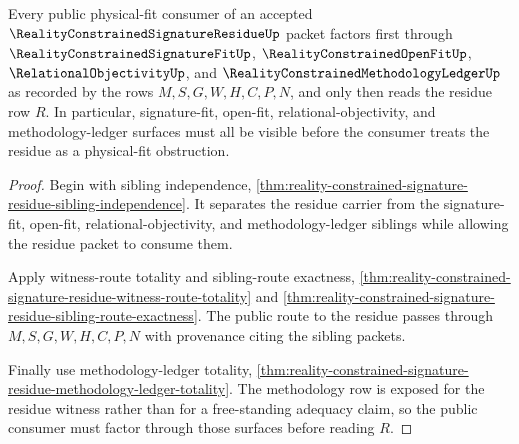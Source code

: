 \begin{theorem}
\label{thm:reality-constrained-signature-residue-public-consumer-factorization}
Every public physical-fit consumer of an accepted
$\RealityConstrainedSignatureResidueUp$ packet factors first through
$\RealityConstrainedSignatureFitUp$, $\RealityConstrainedOpenFitUp$,
$\RelationalObjectivityUp$, and $\RealityConstrainedMethodologyLedgerUp$ as
recorded by the rows $M,S,G,W,H,C,P,N$, and only then reads the residue row
$R$. In particular, signature-fit, open-fit, relational-objectivity, and
methodology-ledger surfaces must all be visible before the consumer treats the
residue as a physical-fit obstruction.
\end{theorem}
\begin{proof}
Begin with sibling independence,
\autoref{thm:reality-constrained-signature-residue-sibling-independence}. It
separates the residue carrier from the signature-fit, open-fit,
relational-objectivity, and methodology-ledger siblings while allowing the
residue packet to consume them.

Apply witness-route totality and sibling-route exactness,
\autoref{thm:reality-constrained-signature-residue-witness-route-totality} and
\autoref{thm:reality-constrained-signature-residue-sibling-route-exactness}. The
public route to the residue passes through $M,S,G,W,H,C,P,N$ with provenance
citing the sibling packets.

Finally use methodology-ledger totality,
\autoref{thm:reality-constrained-signature-residue-methodology-ledger-totality}.
The methodology row is exposed for the residue witness rather than for a
free-standing adequacy claim, so the public consumer must factor through those
surfaces before reading $R$.
\end{proof}

